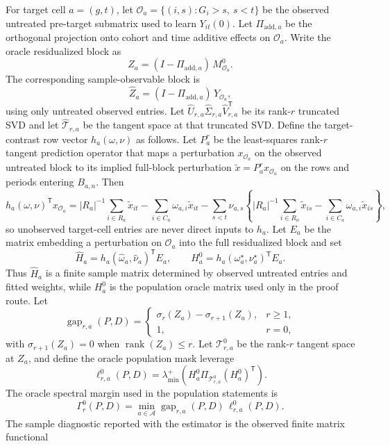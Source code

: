 \documentclass[11pt]{article}
\newcommand{\transpose}{\mathsf{T}}
\theoremstyle{definition}
\theoremstyle{plain}
\theoremstyle{remark}
\begin{document}
For target cell $a=(g,t)$, let
$\mathcal O_a=\{(i,s):G_i>s,\ s<t\}$ be the observed untreated pre-target
submatrix used to learn $Y_{it}(0)$. Let
$\Pi_{\mathrm{add},a}$ be the orthogonal projection onto cohort and time
additive effects on $\mathcal O_a$. Write the oracle residualized block as
\[
  Z_a=(I-\Pi_{\mathrm{add},a})\,M^0_{\mathcal O_a}.
\]
The corresponding sample-observable block is
\[
  \widehat Z_a=(I-\Pi_{\mathrm{add},a})\,Y_{\mathcal O_a},
\]
using only untreated observed entries. Let
$\widehat U_{r,a}\widehat\Sigma_{r,a}\widehat V_{r,a}^{\transpose}$ be its
rank-$r$ truncated SVD and let $\widehat{\mathcal T}_{r,a}$ be the tangent
space at that truncated SVD. Define the target-contrast row vector
$h_a(\omega,\nu)$ as follows. Let $P^r_a$ be the least-squares rank-$r$
tangent prediction operator that maps a perturbation $x_{\mathcal O_a}$ on
the observed untreated block to its implied full-block perturbation
$\widetilde x=P^r_a x_{\mathcal O_a}$ on the rows and periods entering
$B_{a,n}$. Then
\[
  h_a(\omega,\nu)^\transpose x_{\mathcal O_a}
  =
  |R_a|^{-1}\sum_{i\in R_a}\widetilde x_{it}
  -\sum_{i\in C_a}\omega_{a,i}\widetilde x_{it}
  -\sum_{s<t}\nu_{a,s}
  \left\{|R_a|^{-1}\sum_{i\in R_a}\widetilde x_{is}
  -\sum_{i\in C_a}\omega_{a,i}\widetilde x_{is}\right\},
\]
so unobserved target-cell entries are never direct inputs to $h_a$. Let $E_a$ be the matrix
embedding a perturbation on $\mathcal O_a$ into the full residualized block and
set
\[
  \widehat H_a=h_a(\widehat\omega_a,\widehat\nu_a)^\transpose E_a,
  \qquad
  H^{0}_a=h_a(\omega^\star_a,\nu^\star_a)^\transpose E_a .
\]
Thus $\widehat H_a$ is a finite sample matrix determined by observed untreated
entries and fitted weights, while $H^0_a$ is the population oracle matrix used
only in the proof route.
Let
\[
  \operatorname{gap}_{r,a}(P,D)=
  \begin{cases}
    \sigma_r(Z_a)-\sigma_{r+1}(Z_a), & r\ge 1,\\
    1, & r=0,
  \end{cases}
\]
with $\sigma_{r+1}(Z_a)=0$ when $\operatorname{rank}(Z_a)\le r$. Let
$\mathcal T^0_{r,a}$ be the rank-$r$ tangent space at $Z_a$, and define the
oracle population mask leverage
\[
  \ell^0_{r,a}(P,D)=
  \lambda_{\min}^{+}\!\left(
  H^0_a\Pi_{\mathcal T^0_{r,a}}(H^0_a)^{\transpose}\right).
\]
The oracle spectral margin used in the population statements is
\[
  \Gamma^0_r(P,D)=\min_{a\in\mathcal A}
  \operatorname{gap}_{r,a}(P,D)\,\ell^0_{r,a}(P,D).
\]
The sample diagnostic reported with the estimator is the observed finite
matrix functional
\end{document}
